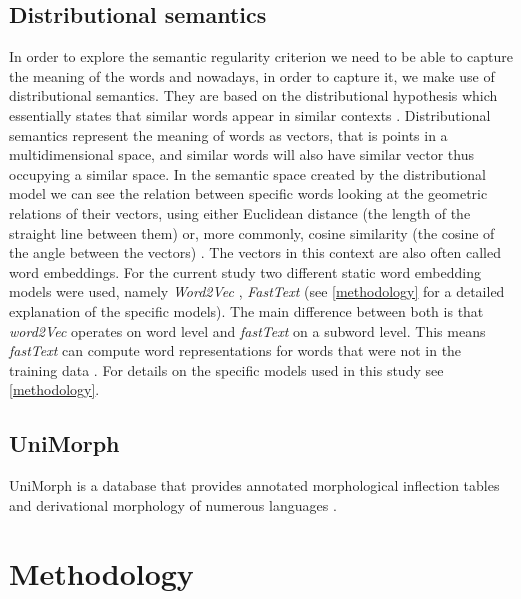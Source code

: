 \documentclass[12pt]{article}
\begin{document}
\subsection{Distributional semantics} \label{distributional-semantics}
In order to explore the semantic regularity criterion we need to be able to capture the meaning of the words and nowadays, in order to capture it, we make use of distributional semantics. They are based on the distributional hypothesis which essentially states that similar words appear in similar contexts \parencite{boleda2020DistributionalSemanticsLinguistic}. Distributional semantics represent the meaning of words as vectors, that is points in a multidimensional space, and similar words will also have similar vector thus occupying a similar space. In the semantic space created by the distributional model we can see the relation between specific words looking at the geometric relations of their vectors, using either Euclidean distance (the length of the straight line between them) or, more commonly, cosine similarity (the cosine of the angle between the vectors) \parencite{boleda2020DistributionalSemanticsLinguistic,chandrasekaran2021EvolutionSemanticSimilarity}. The vectors in this context are also often called word embeddings. For the current study two different static word embedding models were used, namely \textit{Word2Vec} \parencite{mikolov2013EfficientEstimationWord}, \textit{FastText} \parencite{bojanowski2017EnrichingWordVectors} (see \autoref{methodology} for a detailed explanation of the specific models). The main difference between both is that \textit{word2Vec} operates on word level and \textit{fastText} on a subword level. This means \textit{fastText} can compute word representations for words that were not in the training data \parencite{bojanowski2017EnrichingWordVectors}. %
For details on the specific models used in this study see \autoref{methodology}.

\subsection{UniMorph}

UniMorph is a database that provides annotated morphological inflection tables and derivational morphology of numerous languages \parencite{batsuren2022UniMorph40Universal}.

\section{Methodology} \label{methodology}
\end{document}
